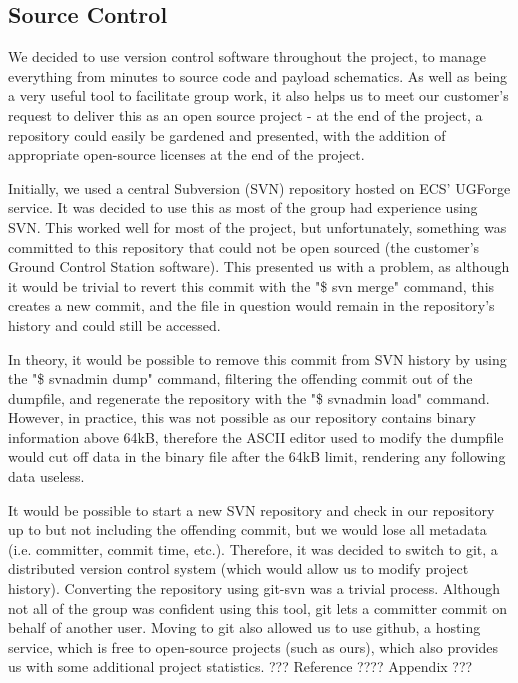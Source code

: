 \subsection{Source Control}

We decided to use version control software throughout the project, to manage 
everything from minutes to source code and payload schematics. As well as 
being a very useful tool to facilitate group work, it also helps us to meet 
our customer's request to deliver this as an open source project - at the end 
of the project, a repository could easily be gardened and presented, with the 
addition of appropriate open-source licenses at the end of the project.

Initially, we used a central Subversion (SVN) repository hosted on ECS' 
UGForge service. It was decided to use this as most of the group had 
experience using SVN. This worked well for most of the project, but 
unfortunately, something was committed to this repository that could not be 
open sourced (the customer's Ground Control Station software). This presented 
us with a problem, as although it would be trivial to revert this commit with 
the "\$ svn merge" command, this creates a new commit, and the file in 
question would remain in the repository's history and could still be accessed.

In theory, it would be possible to remove this commit from SVN history by 
using the "\$ svnadmin dump" command, filtering the offending commit out of 
the dumpfile, and regenerate the repository with the "\$ svnadmin load" 
command. However, in practice, this was not possible as our repository 
contains binary information above 64kB, therefore the ASCII editor used to 
modify the dumpfile would cut off data in the binary file after the 64kB 
limit, rendering any following data useless.

It would be possible to start a new SVN repository and check in our 
repository up to but not including the offending commit, but we would lose 
all metadata (i.e. committer, commit time, etc.). Therefore, it was decided to 
switch to git, a distributed version control system (which would allow us to 
modify project history). Converting the repository using git-svn was a trivial 
process. Although not all of the group was confident using this tool, git 
lets a committer commit on behalf of another user. Moving to git also 
allowed us to use github, a hosting service, which is free to open-source 
projects (such as ours), which also provides us with some additional 
project statistics. ??? Reference ???? Appendix ???
